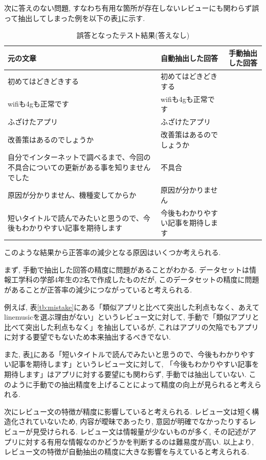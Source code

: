 次に答えのない問題, すなわち有用な箇所が存在しないレビューにも関わらず誤って抽出してしまった例を以下の表\ref{tb:mistake2}に示す.
\begin{table}[htbp]
  \caption{誤答となったテスト結果(答えなし)}
  \label{tb:mistake2}
  \begin{center}
  \begin{tabularx}{\linewidth}{|X|X|X|}
    \hline
    元の文章&自動抽出した回答&手動抽出した回答\\\hline\hline
    初めてはどきどきする&初めてはどきどきする&\\\hline
    wifiも4gも正常です&wifiも4gも正常です&\\\hline
    ふざけたアプリ&ふざけたアプリ&\\\hline
    改善策はあるのでしょうか&改善策はあるのでしょうか&\\\hline
    自分でインターネットで調べるまで、今回の不具合についての更新がある事を知りませんでした&不具合&\\\hline
    原因が分かりません、機種変してからか&原因が分かりません&\\\hline
    短いタイトルで読んでみたいと思うので、今後もわかりやすい記事を期待します&今後もわかりやすい記事を期待します&\\\hline
  \end{tabularx}\end{center}
\end{table}

このような結果から正答率の減少となる原因はいくつか考えられる. 

まず, 手動で抽出した回答の精度に問題があることがわかる. データセットは情報工学科の学部4年生の2名で作成したものだが, このデータセットの精度に問題があることが正答率の減少につながっていると考えられる. 

例えば, 表\ref{tb:mistake}にある「類似アプリと比べて突出した利点もなく、あえてlinemusicを選ぶ理由がない」というレビュー文に対して, 手動で「類似アプリと比べて突出した利点もなく」を抽出しているが, これはアプリの欠陥でもアプリに対する要望でもないため本来抽出するべきでない. 

また, 表\ref{tb:mistake2}にある「短いタイトルで読んでみたいと思うので、今後もわかりやすい記事を期待します」というレビュー文に対して, 「今後もわかりやすい記事を期待します」はアプリに対する要望にも関わらず, 手動では抽出していない. このように手動での抽出精度を上げることによって精度の向上が見られると考えられる. 

次にレビュー文の特徴が精度に影響していると考えられる. レビュー文は短く構造化されていないため, 内容が曖昧であったり, 意図が明確でなかったりするレビューが見受けられる. レビュー文は情報量が少ないものが多く, その記述がアプリに対する有用な情報なのかどうかを判断するのは難易度が高い. 以上より, レビュー文の特徴が自動抽出の精度に大きな影響を与えていると考えられる. 

